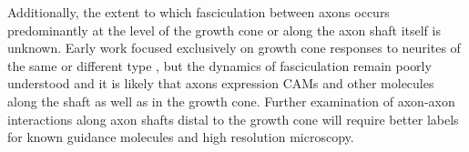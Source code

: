 Additionally, the extent to which fasciculation between axons occurs predominantly at the level of the growth cone or along the axon shaft itself is unknown.
Early work focused exclusively on growth cone responses to neurites of the same or different type \cite{nakajima1965selectivity}, but the dynamics of fasciculation remain poorly understood and it is likely that axons expression CAMs and other molecules along the shaft as well as in the growth cone. 
Further examination of axon-axon interactions along axon shafts distal to the growth cone will require better labels for known guidance molecules and high resolution microscopy.